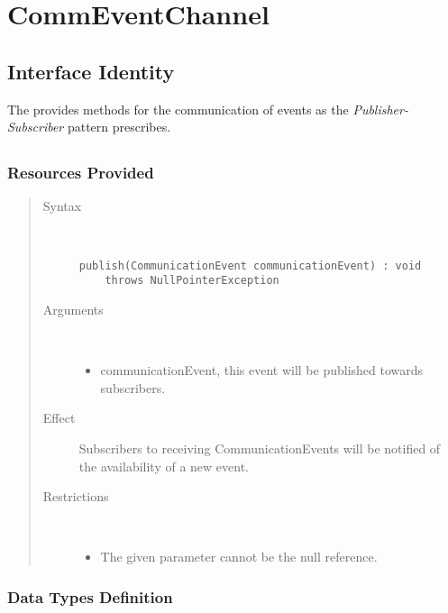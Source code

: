 \section{CommEventChannel}
\label{api:rm-trame-channel}

\subsection{Interface Identity}

\npar The  provides methods for the communication of
events as the \emph{Publisher-Subscriber} pattern prescribes.

\subsection{}

\subsubsection{Resources Provided}

\begin{quote}
	\begin{description}
		\item[Syntax] \
		\begin{verbatim}
publish(CommunicationEvent communicationEvent) : void
    throws NullPointerException
		\end{verbatim}
		\item[Arguments] \
		\begin{itemize}
		  \item communicationEvent, this event will be published towards subscribers.
		\end{itemize}
		\item[Effect] Subscribers to receiving CommunicationEvents will be notified of
		the availability of a new event. 
		\item[Restrictions] \
		\begin{itemize}
		  \item The given parameter cannot be the null reference.
		\end{itemize}
	\end{description} 
\end{quote}

\subsubsection{Data Types Definition}

